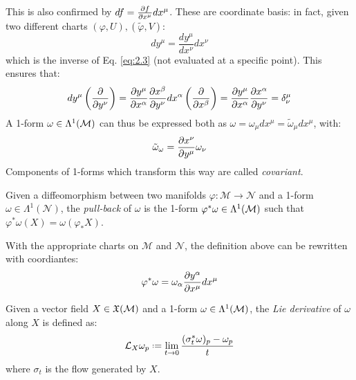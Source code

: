 This is also confirmed by $ df = \frac{\partial f}{\partial x^{\mu}} dx^{\mu} $. These are coordinate basis: in fact, given two different charts $ (\varphi,U), (\tilde{\varphi},V) $:
\begin{equation}
  dy^{\mu} = \frac{dy^{\mu}}{dx^{\nu}}dx^{\nu}
  \label{eq:}
\end{equation}
which is the inverse of Eq. \ref{eq:2.3} (not evaluated at a specific point). This ensures that:
\begin{equation*}
  dy^{\mu}\left( \frac{\partial}{\partial y^{\nu}} \right) = \frac{\partial y^{\mu}}{\partial x^{\alpha}} \frac{\partial x^{\beta}}{\partial y^{\nu}} dx^{\alpha}\left( \frac{\partial}{\partial x^{\beta}} \right) = \frac{\partial y^{\mu}}{\partial x^{\alpha}} \frac{\partial x^{\alpha}}{\partial y^{\nu}} = \delta^{\mu}_{\nu}
\end{equation*}
A 1-form $ \omega \in \Lambda^{1}(\mathcal{M}) $ can thus be expressed both as $ \omega = \omega_{\mu} dx^{\mu} = \tilde{\omega}_{\mu} dx^{\mu} $, with:
\begin{equation}
  \tilde{\omega}_{\omega} = \frac{\partial x^{\nu}}{\partial y^{\mu}} \omega_{\nu}
  \label{eq:2.19}
\end{equation}
Components of 1-forms which transform this way are called \textit{covariant}.

\begin{definition}
  Given a diffeomorphism between two manifolds $ \varphi : \mathcal{M} \rightarrow \mathcal{N} $ and a 1-form $ \omega \in \Lambda^1(\mathcal{N}) $, the \textit{pull-back} of $ \omega $ is the 1-form $ \varphi^*\omega \in \Lambda^{1}(\mathcal{M}) $ such that $ \varphi^*\omega(X) = \omega(\varphi_*X) $.
\end{definition}

With the appropriate charts on $ \mathcal{M} $ and $ \mathcal{N} $, the definition above can be rewritten with coordiantes:
\begin{equation}
  \varphi^*\omega = \omega_{\alpha} \frac{\partial y^{\alpha}}{\partial x^{\mu}} dx^{\mu}
  \label{eq:2.20}
\end{equation}

\begin{definition}
  Given a vector field $ X \in \mathfrak{X}(\mathcal{M}) $ and a 1-form $ \omega \in \Lambda^{1}(\mathcal{M}) $, the \textit{Lie derivative} of $ \omega $ along $ X $ is defined as:
  \begin{equation}
    \ld_X \omega_p \defeq \lim_{t \rightarrow 0} \frac{(\sigma_t^* \omega)_p - \omega_p}{t}
    \label{eq:2.21}
  \end{equation}
  where $ \sigma_t $ is the flow generated by $ X $.
\end{definition}

